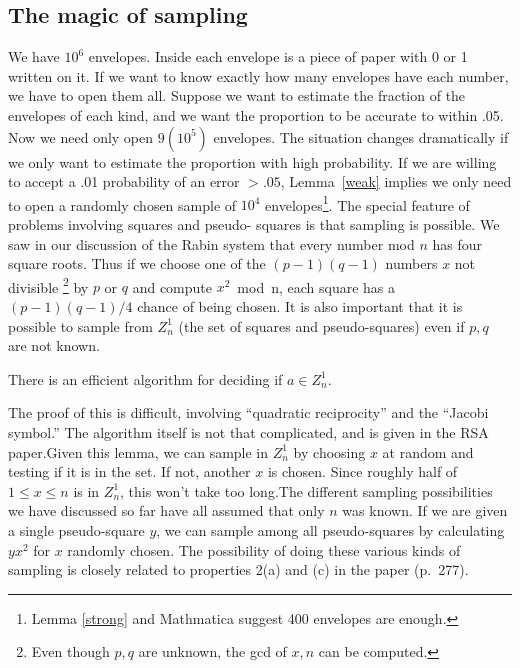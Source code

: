 \subsection{The magic of sampling\label{Sa}}
We have $10^6$ envelopes.  Inside each envelope is a piece of paper with
0 or 1 written on it.  If we want to know exactly how many envelopes have
each number, we have to open them all.  Suppose we want to estimate the
fraction of the envelopes of each kind, and we want the proportion to be
accurate to within .05.  Now we need only open $9(10^5)$ envelopes.
\pq The situation changes dramatically if we only want to estimate the
proportion with high probability.  If we are willing to accept a .01
probability of an error $>.05$, Lemma~\ref{weak} implies we only need
to open a randomly chosen sample of $10^4$ envelopes\footnote{Lemma
\ref{strong} and Mathmatica suggest 400 envelopes are enough.}.
\pq The special feature of problems involving squares and pseudo-%
squares is that sampling is possible.  We saw in our discussion of
the Rabin system that every number mod $n$ has four square roots.
Thus if we choose one of the $(p-1)(q-1)$ numbers $x$ not divisible%
\footnote{Even though $p,q$ are unknown, the gcd of $x,n$ can
be computed.} by $p$ or $q$
 and compute $x^2$~mod~n, each square has a $(p-1)(q-1)/4$
chance of being chosen.  It is also important that it is possible to
sample from $Z^1_n$ (the set of squares and pseudo-squares) even if
$p,q$ are not known.\begin{Le} \label{Jac}There is an efficient algorithm for
deciding if $a\in Z^1_n$.\end{Le}The proof of this is difficult, 
involving ``quadratic reciprocity'' and the ``Jacobi symbol.''  The
algorithm itself is not that complicated, and is given in the RSA 
paper.\pq Given this lemma, we can sample in $Z^1_n$ by choosing $x$
at random and testing if it is in the set.  If not, another $x$ is
chosen.  Since roughly half of $1\le x\le n$ is in $Z^1_n$, this won't
take too long.\pq The different sampling possibilities we have discussed
so far have all assumed that only $n$ was known.  If we are given a single
pseudo-square $y$, we can sample among all pseudo-squares by calculating
$yx^2$ for $x$ randomly chosen.
\pq The possibility of doing these various kinds of sampling
is closely related to properties 2(a) and (c) in the paper (p.~277).
